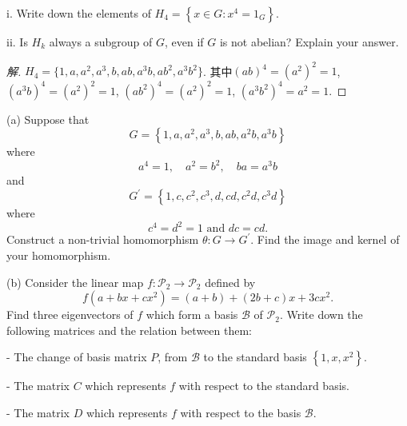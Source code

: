 \begin{question}{}{}
	i. Write down the elements of $H_{4}=\left\{x \in G: x^{4}=1_{G}\right\}$.
	
	ii. Is $H_{k}$ always a subgroup of $G$, even if $G$ is not abelian? Explain your answer.
\end{question}
\begin{proof}[解]
	$H_4=\{1,a,a^2,a^3,b,ab,a^3b,ab^2,a^3b^2\}$. 其中$(ab)^4=(a^2)^2=1$, $(a^3b)^4=(a^2)^2=1$, $(ab^2)^4=(a^2)^2=1$, $(a^3b^2)^4=a^2=1$.
\end{proof}
%
\begin{question}{}{}
	(a) Suppose that
	$$
	G=\left\{1, a, a^{2}, a^{3}, b, a b, a^{2} b, a^{3} b\right\}
	$$
	where
	$$
	a^{4}=1, \quad a^{2}=b^{2}, \quad b a=a^{3} b
	$$
	and
	$$
	G^{\prime}=\left\{1, c, c^{2}, c^{3}, d, c d, c^{2} d, c^{3} d\right\}
	$$
	where
	$$
	c^{4}=d^{2}=1 \text { and } d c=c d .
	$$
	Construct a non-trivial homomorphism $\theta: G \rightarrow G^{\prime}$.
	Find the image and kernel of your homomorphism.
	
	(b) Consider the linear map $f: \mathcal{P}_{2} \rightarrow \mathcal{P}_{2}$ defined by
	$$
	f\left(a+b x+c x^{2}\right)=(a+b)+(2 b+c) x+3 c x^{2} .
	$$
	Find three eigenvectors of $f$ which form a basis $\mathcal{B}$ of $\mathcal{P}_{2}$.
	Write down the following matrices and the relation between them:
	
	- The change of basis matrix $P$, from $\mathcal{B}$ to the standard basis $\left\{1, x, x^{2}\right\}$.
	
	- The matrix $C$ which represents $f$ with respect to the standard basis.
	
	- The matrix $D$ which represents $f$ with respect to the basis $\mathcal{B}$.
\end{question}
%
